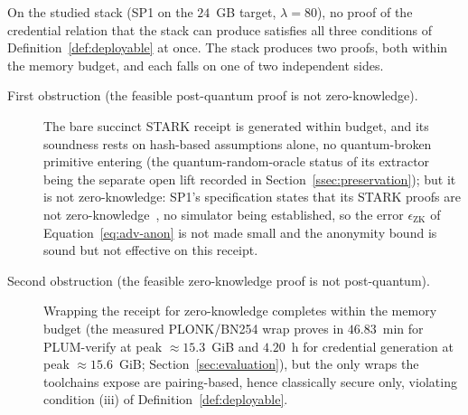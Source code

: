 \begin{proposition}\label{prop:wall}
    On the studied stack (SP1 on the $24$~GB target, $\lambda=80$), no proof of the credential relation that the stack can produce satisfies all three conditions of Definition~\ref{def:deployable} at once. The stack produces two proofs, both within the memory budget, and each falls on one of two independent sides.
    \begin{description}
      \item[First obstruction (the feasible post-quantum proof is not zero-knowledge).] The bare succinct STARK receipt is generated within budget, and its soundness rests on hash-based assumptions alone, no quantum-broken primitive entering (the quantum-random-oracle status of its extractor being the separate open lift recorded in Section~\ref{ssec:preservation}); but it is not zero-knowledge: SP1's specification states that its STARK proofs are not zero-knowledge~\cite{sp1docs-sec}, no simulator being established, so the error $\epsilon_{\mathrm{ZK}}$ of Equation~\eqref{eq:adv-anon} is not made small and the anonymity bound is sound but not effective on this receipt.
      \item[Second obstruction (the feasible zero-knowledge proof is not post-quantum).] Wrapping the receipt for zero-knowledge completes within the memory budget (the measured PLONK/BN254 wrap proves in $46.83$~min for PLUM-verify at peak $\approx15.3$~GiB and $4.20$~h for credential generation at peak $\approx15.6$~GiB; Section~\ref{sec:evaluation}), but the only wraps the toolchains expose are pairing-based, hence classically secure only, violating condition (iii) of Definition~\ref{def:deployable}.
    \end{description}

\end{proposition}
